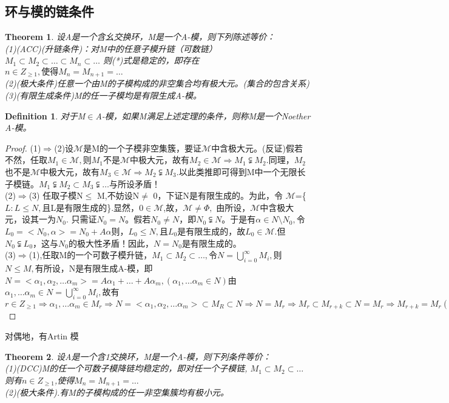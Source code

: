 \documentclass[UTF8]{article}
\newtheorem{thm}{Theorem}
\newtheorem{defn}{Definition}
\begin{document}
\subsection{环与模的链条件}
\begin{thm}
	设A是一个含幺交换环，M是一个A-模，则下列陈述等价：\\
	(1)(ACC)(升链条件)：对M中的任意子模升链（可数链）
	$M_1\subset M_2\subset\ldots\subset M_n\subset\ldots$
	则(*)式是稳定的，即存在$n\in Z_{\geq1},使得M_n=M_{n+1}=\ldots$\\
	(2)(极大条件)任意一个由M的子模构成的非空集合均有极大元。(集合的包含关系)\\
	(3)(有限生成条件)M的任一子模均是有限生成A-模。
\end{thm}
\begin{defn}
	对于M$\in $A-模，如果M满足上述定理的条件，则称M是一个Noether A-模。
\end{defn}
\begin{proof}
	(1)$\Rightarrow$(2)设$\mathscr{M}$是M的一个子模非空集簇，要证$\mathscr{M}$中含极大元。(反证)假若不然，任取$M_1\in \mathscr{M},$则$M_1$不是$\mathscr{M}$中极大元，故有$M_2\in \mathscr{M}\Rightarrow M_1\subsetneqq M_2$.同理，$M_2$也不是$\mathscr{M}$中极大元，故有$M_3\in \mathscr{M}\Rightarrow M_2\subsetneqq M_3$.以此类推即可得到M中一个无限长子模链。$M_1\subsetneqq M_2\subset M_3\subsetneqq\ldots$与所设矛盾！\\
	(2)$\Rightarrow$(3) 任取子模N$\leq$ M,不妨设N$\neq$ 0，下证N是有限生成的。为此，令
	$\mathscr{M}$=\{$L:L\leq N,$且L是有限生成的\}.显然，$0\in \mathscr{M}$,故，$\mathscr{M}\neq \Phi,$ 由所设，$\mathscr{M}$中含极大元，设其一为$N_0$. 只需证$N_0=N$。假若$N_0\neq N$，即$N_0\subsetneqq N$。于是有$\alpha\in N\setminus N_0,$令$L_0=<N_0,\alpha>=N_0+A\alpha$则，$L_0\leq N,$且$L_0$是有限生成的，故$L_0\in \mathscr{M}$.但$N_0\subsetneqq L_0$，这与$N_0$的极大性矛盾！因此，$N=N_0$是有限生成的。\\
	(3)$\Rightarrow$(1),任取M的一个可数子模升链，$M_1\subset M_2\subset\ldots,$令$N=\bigcup\limits_{i=0}^{\infty}{M_i},$则$N\leq M,$有所设，N是有限生成A-模，即$N=<\alpha_1,\alpha_2,\ldots\alpha_m>=A\alpha_1+\ldots+A\alpha_m,(\alpha_1,\ldots\alpha_m\in N)
	$由$\alpha_1,\ldots\alpha_m\in N=\bigcup\limits_{i=0}^\infty{M_i},$故有$r\in Z_{\geq1}\Rightarrow \alpha_1,\ldots\alpha_m\in M_r\Rightarrow N=<\alpha_1,\alpha_2,\ldots\alpha_m>\subset M_R\subset N\Rightarrow N=M_r\Rightarrow M_r\subset M_{r+k}\subset N=M_r\Rightarrow M_{r+k}=M_r(\forall k\in Z_{\geq0})$
\end{proof}
对偶地，有Artin 模
\begin{thm}
	设A是一个含1交换环，M是一个A-模，则下列条件等价：\\
	(1)(DCC)M的任一个可数子模降链均稳定的，即对任一个子模链,
	$M_1\subset M_2\subset\ldots $则有$ n \in Z_{\geq1}$,使得$M_n=M_{n+1}=\ldots $\\
	(2)(极大条件).有M的子模构成的任一非空集簇均有极小元。
\end{thm}
\end{document}
